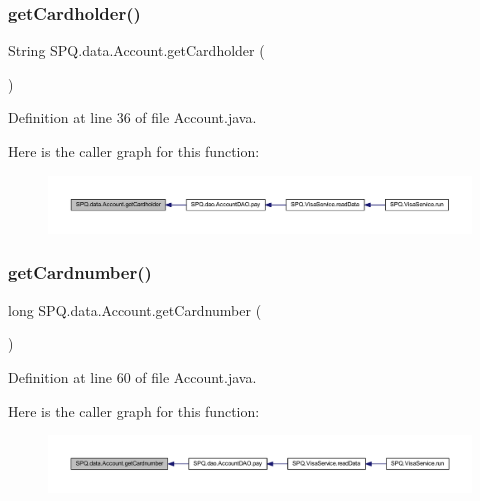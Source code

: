 \subsubsection{\texorpdfstring{get\+Cardholder()}{getCardholder()}}
{\footnotesize\ttfamily String S\+P\+Q.\+data.\+Account.\+get\+Cardholder (\begin{DoxyParamCaption}{ }\end{DoxyParamCaption})}



Definition at line 36 of file Account.\+java.

Here is the caller graph for this function\+:\nopagebreak
\begin{figure}[H]
\begin{center}
\leavevmode
\includegraphics[width=350pt]{class_s_p_q_1_1data_1_1_account_ab4297cf24cbff2975364306a31e75db9_icgraph}
\end{center}
\end{figure}
\mbox{\label{class_s_p_q_1_1data_1_1_account_a54797a8ae92cb43fa9126700579ca9bf}} 
\subsubsection{\texorpdfstring{get\+Cardnumber()}{getCardnumber()}}
{\footnotesize\ttfamily long S\+P\+Q.\+data.\+Account.\+get\+Cardnumber (\begin{DoxyParamCaption}{ }\end{DoxyParamCaption})}



Definition at line 60 of file Account.\+java.

Here is the caller graph for this function\+:\nopagebreak
\begin{figure}[H]
\begin{center}
\leavevmode
\includegraphics[width=350pt]{class_s_p_q_1_1data_1_1_account_a54797a8ae92cb43fa9126700579ca9bf_icgraph}
\end{center}
\end{figure}
\mbox{\label{class_s_p_q_1_1data_1_1_account_a6f30fcec03cf6e342b7c6d932166ebb1}} 
